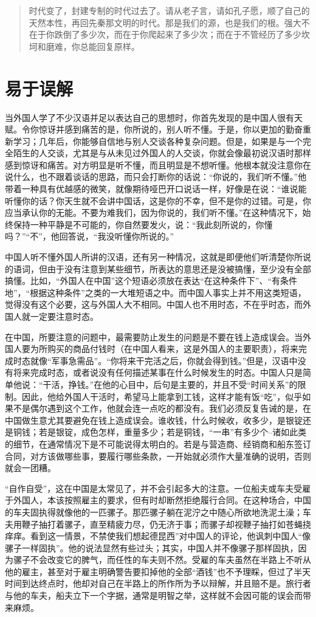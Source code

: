\documentclass[12pt,oneside]{book}
\begin{document}
\begin{common-format}
\begin{quotation}
时代变了，封建专制的时代过去了。请从老子言，请如孔子愿，顺了自己的天然本性，再回先秦那文明的时代。那是我们的源，也是我们的根。强大不在于你跌倒了多少次，而在于你爬起来了多少次；而在于不管经历了多少坎坷和磨难，你总能回复原样。
\end{quotation}


\chapter{易于误解}
当外国人学了不少汉语并足以表达自己的思想时，你首先发现的是中国人很有天赋。令你惊讶并感到痛苦的是，你所说的，别人听不懂。于是，你以更加的勤奋重新学习；几年后，你能够自信地与别人交谈各种复杂问题。但是，如果是与一个完全陌生的人交谈，尤其是与从未见过外国人的人交谈，你就会像最初说汉语时那样感到惊讶和痛苦。对方明显是听不懂，而且明显是不想听懂。他根本就没注意你在说什么，也不跟着谈话的思路，而只会打断你的话说：“你说的，我们听不懂。”他带着一种具有优越感的微笑，就像期待哑巴开口说话一样，好像是在说：“谁说能听懂你的话？你天生就不会讲中国话，这是你的不幸，但不是你的过错。可是，你应当承认你的无能。不要为难我们，因为你说的，我们听不懂。”在这种情况下，始终保持一种平静是不可能的，你自然要发火，说：“我此刻所说的，你懂吗？”“不”，他回答说，“我没听懂你所说的。” 

中国人听不懂外国人所讲的汉语，还有另一种情况，这就是即便他们听清楚你所说的语词，但由于没有注意到某些细节，所表达的意思还是没被搞懂，至少没有全部搞懂。比如，“外国人在中国”这个短语必须放在表达“在这种条件下”、“有条件地”，“根据这种条件”之类的一大堆短语之中。而中国人事实上并不用这类短语，觉得没有这个必要，这与外国人大不相同。中国人也不用时态，不在乎时态，而外国人就一定要注意时态。 

在中国，所要注意的问题中，最需要防止发生的问题是不要在钱上造成误会。当外国人要为所购买的商品付钱时（在中国人看来，这是外国人的主要职责），将来完成时态就像“军事急需品”。“你将来干完活之后，你就会得到钱。”但是，汉语中没有将来完成时态，或者说没有任何描述某事在什么时候发生的时态。中国人只是简单他说：“干活，挣钱。”在他的心目中，后句是主要的，并且不受“时间关系”的限制。因此，他给外国人干活时，希望马上能拿到工钱，这样才能有饭“吃”，似乎如果不是偶尔遇到这个工作，他就会连一点吃的都没有。我们必须反复告诫的是，在中国做生意尤其要避免在钱上造成误会。谁收钱，什么时候收，收多少，是银锭还是铜钱；若是银锭，成色怎样，重量多少；若是铜钱，“一串”有多少个--诸如此类的细节，在通常情况下是不可能说得太明白的。若是与营造商、经销商和船东签订合同，对方该做哪些事，要履行哪些条款，一开始就必须作大量准确的说明，否则就会一团糟。 

“自作自受”，这在中国是太常见了，并不会引起多大的注意。一位船夫或车夫受雇于外国人，本该按照雇主的要求，但有时却断然拒绝履行合同。在这种场合，中国的车夫固执得就像他的一匹骡子。那匹骡子躺在泥泞之中随心所欲地洗泥土澡；车夫用鞭子抽打着骡子，直至精疲力尽，仍无济于事；而骡子却视鞭子抽打如苍蝇挠痒痒。看到这一情景，不禁使我们想起德昆西”对中国人的评论，他讽刺中国人“像骡子一样固执”。他的说法显然有些过头；其实，中国人并不像骡子那样固执，因为骡子不会改变它的脾气，而任性的车夫则不然。受雇的车夫虽然在半路上不听从他的雇主，甚至对于雇主明确警告要扣掉他的全部“酒钱”也不予理睬，但过了半天时间到达终点时，他却对自己在半路上的所作所为予以辩解，并且赔不是。旅行者与他的车夫，船夫立下一个字据，通常是明智之举，这样就不会因可能的误会而带来麻烦。 


\end{common-format}
\end{document}
